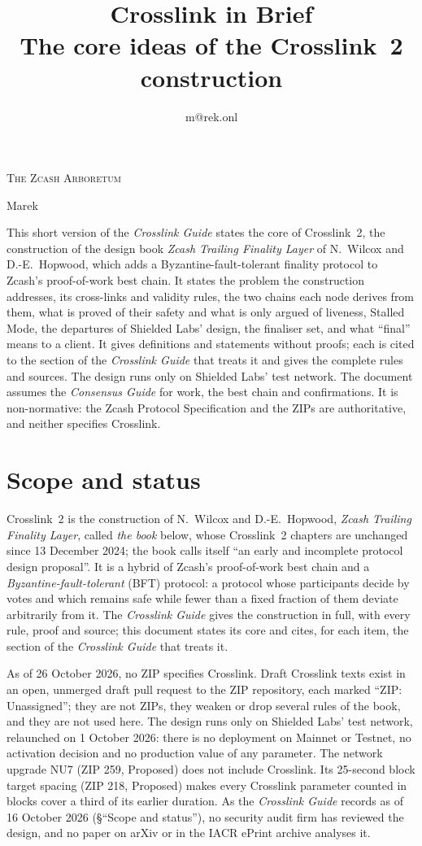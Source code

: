 \documentclass[11pt,a4paper]{article}
\title{\textbf{\Huge Crosslink in Brief}\\[6pt]\large The core ideas of the Crosslink~2 construction}
\author{m@rek.onl}
\date{}
\makeatletter
\theoremstyle{definition}
\let\arb@tableofcontents\tableofcontents
\renewcommand{\tableofcontents}{{\hypersetup{pdfborderstyle={/S/U/W 0}}%
  \arb@tableofcontents}}
\providecommand{\accession}{}
\def\arb@name#1#2\@nil{\def\arbvolname{#2}}
\def\arb@parsetitle\textbf#1\\[#2]#3#4\@nil{\arb@name#1\@nil\def\arb@sub{#4}}
\providecommand{\arbvolname}{}
\renewcommand{\maketitle}{\expandafter\arb@parsetitle\@title\@nil
  \hypersetup{pdftitle={\arbvolname: \arb@sub},pdfauthor={Marek}}%
  \thispagestyle{empty}\begingroup\raggedright
  {\fontsize{13.2}{16}\selectfont\scshape The Zcash Arboretum\par}
  \vspace*{50mm}
  {\fontsize{47.3}{50}\selectfont\accession\par}
  \vspace{6mm}
  {\fontsize{22.8}{27}\selectfont\arbvolname\par}
  \vspace{3mm}
  {\fontsize{13.2}{17}\selectfont\arb@sub\par}
  \vspace{18mm}
  {\fontsize{13.2}{17}\selectfont Marek\par}
  {\small\@author\par}
  \endgroup\clearpage}
\renewenvironment{abstract}{%
  \small\begin{center}{\bfseries\abstractname}\end{center}\medskip\noindent\ignorespaces
}{\par\medskip}
\makeatother
\begin{document}
\maketitle
\thispagestyle{empty}

\begin{abstract}
This short version of the \emph{Crosslink Guide} states the core of
Crosslink~2, the construction of the design book \emph{Zcash Trailing
Finality Layer} of N.~Wilcox and D.-E.~Hopwood, which adds a
Byzantine-fault-tolerant finality protocol to Zcash's proof-of-work best
chain. It states the problem the construction addresses, its cross-links and
validity rules, the two chains each node derives from them, what is proved
of their safety and what is only argued of liveness, Stalled Mode, the
departures of Shielded Labs' design, the finaliser set, and what ``final''
means to a client. It gives definitions and statements without proofs; each
is cited to the section of the \emph{Crosslink Guide} that treats it and
gives the complete rules and sources. The design runs only on Shielded
Labs' test network. The document assumes the
\emph{Consensus Guide} for work, the best chain and confirmations. It is
non-normative: the Zcash Protocol Specification and the ZIPs are
authoritative, and neither specifies Crosslink.
\end{abstract}
\clearpage \tableofcontents \clearpage

\section{Scope and status}\label{sec:scope}

Crosslink~2 is the construction of N.~Wilcox and D.-E.~Hopwood, \emph{Zcash
Trailing Finality Layer}, called \emph{the book} below, whose Crosslink~2
chapters are unchanged since 13 December 2024; the book calls itself ``an
early and incomplete protocol design proposal''. It is a hybrid of Zcash's
proof-of-work best chain and a \emph{Byzantine-fault-tolerant} (BFT)
protocol: a protocol whose participants decide by votes and which remains
safe while fewer than a fixed fraction of them deviate arbitrarily from it.
The \emph{Crosslink Guide} gives the construction in full, with every rule,
proof and source; this document states its core and cites, for each item,
the section of the \emph{Crosslink Guide} that treats it.

As of 26 October 2026, no ZIP specifies Crosslink. Draft Crosslink texts
exist in an open, unmerged draft pull request to the ZIP repository, each
marked ``ZIP: Unassigned''; they are not ZIPs, they weaken or drop several
rules of the book, and they are not used here. The design runs only on
Shielded Labs' test network, relaunched on 1 October 2026: there is no
deployment on Mainnet or Testnet, no activation decision and no production
value of any parameter. The network upgrade NU7 (ZIP 259, Proposed) does not
include Crosslink. Its 25-second block target spacing (ZIP 218, Proposed)
makes every Crosslink parameter counted in blocks cover a third of its
earlier duration. As the \emph{Crosslink Guide} records as of 16 October
2026 (\S``Scope and status''), no security audit firm has reviewed the
design, and no paper on arXiv or in the IACR ePrint archive analyses it.
\end{document}
